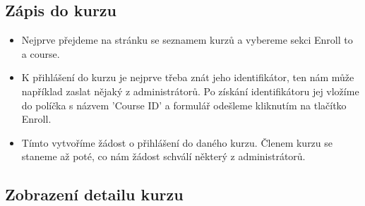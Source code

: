 \subsection{Zápis do kurzu}

\begin{itemize}
	\item Nejprve přejdeme na stránku se seznamem kurzů a vybereme sekci Enroll to a course.
	\item K přihlášení do kurzu je nejprve třeba znát jeho identifikátor, ten nám může například zaslat nějaký z administrátorů. Po získání identifikátoru jej vložíme do políčka s názvem 'Course ID' a formulář odešleme kliknutím na tlačítko Enroll.
	\item Tímto vytvoříme žádost o přihlášení do daného kurzu. Členem kurzu se staneme až poté, co nám žádost schválí některý z administrátorů.
\end{itemize}

\subsection{Zobrazení detailu kurzu}

